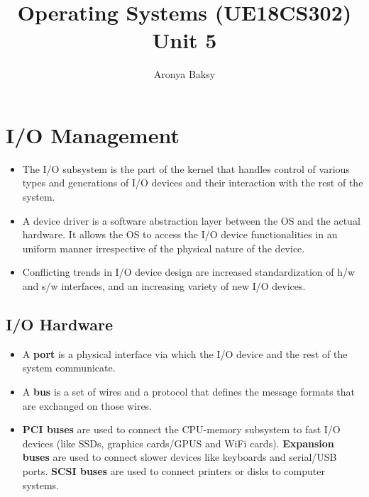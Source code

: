 \documentclass{article}
\title{Operating Systems (UE18CS302)\\
    \large Unit 5}
\author{Aronya Baksy}
\theoremstyle{plain}
\theoremstyle{definition}
\begin{document}
    \maketitle

\section{I/O Management}
\begin{itemize}
    \item The I/O subsystem is the part of the kernel that handles control of various types and generations of I/O devices and their interaction with the rest of the system.
    
    \item A device driver is a software abstraction layer between the OS and the actual hardware. It allows the OS to access the I/O device functionalities in an uniform manner irrespective of the physical nature of the device. 
    
    \item Conflicting trends in I/O device design are increased standardization of h/w and s/w interfaces, and an increasing variety of new I/O devices. 
\end{itemize}

\subsection{I/O Hardware}
\begin{itemize}
    \item A \textbf{port} is a physical interface via which the I/O device and the rest of the system communicate. 
    
    \item A \textbf{bus} is a set of wires and a protocol that defines the message formats that are exchanged on those wires. 
    
    \item \textbf{PCI buses} are used to connect the CPU-memory subsystem to fast I/O devices (like SSDs, graphics cards/GPUS and WiFi cards). \textbf{Expansion buses} are used to connect slower devices like keyboards and serial/USB ports. \textbf{SCSI buses} are used to connect printers or disks to computer systems. 
\end{itemize}
\end{document}
